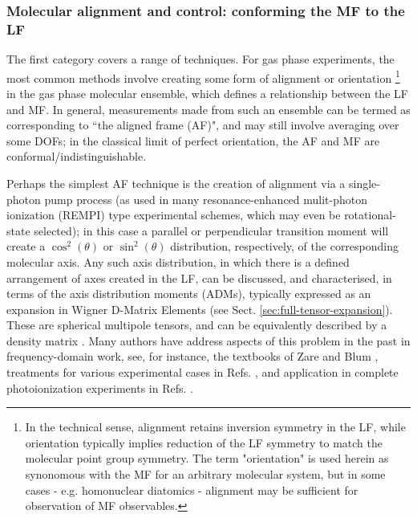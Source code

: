 \documentclass[10pt]{article}
\begin{document}
\subsubsection{Molecular alignment and control: conforming the MF to the LF\label{sec:MF-control}}

The first category covers a range of techniques. For gas phase experiments, the most common methods involve creating some form of alignment or orientation \footnote{In the technical sense, alignment retains 
inversion symmetry in the LF, while orientation typically implies reduction of the LF symmetry to match the molecular point group symmetry. The term "orientation" is used herein as synonomous with the MF for an arbitrary molecular system, but in some cases - e.g. homonuclear diatomics - alignment may be sufficient for observation of MF observables.} 
in the gas phase molecular ensemble, which defines a relationship between the LF and MF. In general, measurements made from such an ensemble can be termed as corresponding to ``the aligned frame (AF)", and may still involve averaging over some DOFs; in the 
classical limit of perfect orientation, the AF and MF are conformal/indistinguishable. 

Perhaps the simplest AF technique is the creation of alignment via a single-photon pump process (as used in many resonance-enhanced mulit-photon ionization (REMPI) type experimental schemes, which may even be rotational-state selected); in this case a parallel or perpendicular transition moment will create a $\cos^2(\theta)$ or $\sin^2(\theta)$ distribution, respectively, of the corresponding molecular axis. Any such axis distribution, in which there is a defined arrangement of axes created in the LF, can be discussed, and characterised, in terms of the axis distribution moments (ADMs), typically expressed as an expansion in Wigner D-Matrix Elements (see Sect. \ref{sec:full-tensor-expansion}). These are spherical multipole tensors, and can be equivalently described by a density matrix \cite{BlumDensityMat}. Many authors have address aspects of this problem in the past in frequency-domain work, see, for instance, the textbooks of Zare \cite{zareAngMom} and Blum \cite{BlumDensityMat}, treatments for various experimental cases in Refs. \cite{Docker1988, Dubs1989, Greene1983}, and application in complete photoionization experiments in Refs. \cite{Leahy1991,hockett2009RotationallyResolvedPhotoelectron}.
\end{document}
